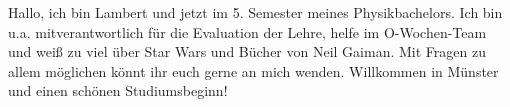 \begin{multicols}{2}
{
Hallo, ich bin Lambert und jetzt im 5. Semester meines Physikbachelors. Ich bin u.a. mitverantwortlich für die Evaluation der Lehre, helfe im O-Wochen-Team
und weiß zu viel über Star Wars und Bücher von Neil Gaiman. Mit Fragen zu allem möglichen könnt ihr euch gerne an mich wenden.
Willkommen in Münster und einen schönen Studiumsbeginn!
}

\vspace{-1.1cm}


\end{multicols}
